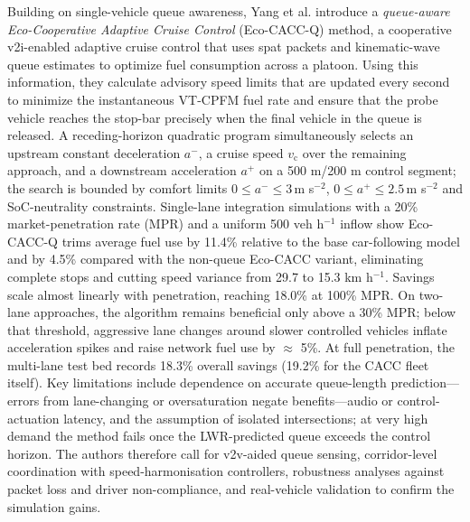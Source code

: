 Building on single-vehicle queue awareness, Yang et al. \cite{Yang2017} introduce a \textit{queue-aware Eco-Cooperative Adaptive Cruise Control} (Eco-CACC-Q) method, a cooperative \ac{v2i}-enabled adaptive cruise control that uses \ac{spat} packets and kinematic-wave queue estimates to optimize fuel consumption across a platoon. Using this information, they calculate advisory speed limits that are updated every second to minimize the instantaneous VT-CPFM fuel rate and ensure that the probe vehicle reaches the stop-bar precisely when the final vehicle in the queue is released. A receding-horizon quadratic program simultaneously selects an upstream constant deceleration $a^{-}$, a cruise speed $v_{\mathrm c}$ over the remaining approach, and a downstream acceleration $a^{+}$ on a 500 m/200 m control segment; the search is bounded by comfort limits $0\le a^{-}\!\le\!3\,$m s$^{-2}$, $0\le a^{+}\!\le\!2.5\,$m s$^{-2}$ and SoC-neutrality constraints. Single-lane integration simulations with a 20\% market-penetration rate (MPR) and a uniform 500 veh h$^{-1}$ inflow show Eco-CACC-Q trims average fuel use by 11.4\% relative to the base car-following model and by 4.5\% compared with the non-queue Eco-CACC variant, eliminating complete stops and cutting speed variance from 29.7 to 15.3 km h$^{-1}$.  Savings scale almost linearly with penetration, reaching 18.0\% at 100\% MPR. On two-lane approaches, the algorithm remains beneficial only above a 30\% MPR; below that threshold, aggressive lane changes around slower controlled vehicles inflate acceleration spikes and raise network fuel use by \(\approx\) 5\%.  At full penetration, the multi-lane test bed records 18.3\% overall savings (19.2\% for the CACC fleet itself). Key limitations include dependence on accurate queue-length prediction—errors from lane-changing or oversaturation negate benefits—audio or control-actuation latency, and the assumption of isolated intersections; at very high demand the method fails once the LWR-predicted queue exceeds the control horizon. The authors therefore call for \ac{v2v}-aided queue sensing, corridor-level coordination with speed-harmonisation controllers, robustness analyses against packet loss and driver non-compliance, and real-vehicle validation to confirm the simulation gains.
\mynewline
